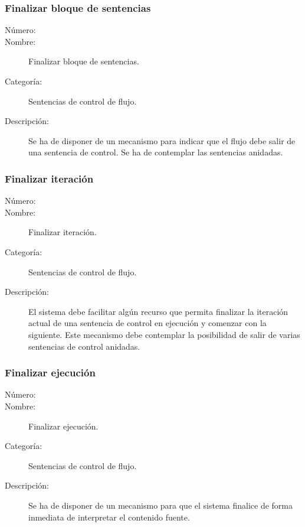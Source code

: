 \subsubsection{Finalizar bloque de sentencias}
	\begin{description}
		\item [Número:] \cn
		\item [Nombre:] Finalizar bloque de sentencias.
		\item [Categoría:] Sentencias de control de flujo.
		\item [Descripción:] Se ha de disponer de un mecanismo para indicar que el flujo debe salir de una sentencia de control. Se ha de contemplar
		las sentencias anidadas.
	\end {description}



\subsubsection{Finalizar iteración}
	\begin{description}
		\item [Número:] \cn
		\item [Nombre:] Finalizar iteración.
		\item [Categoría:] Sentencias de control de flujo.
		\item [Descripción:] El sistema debe facilitar algún recurso que permita finalizar la iteración actual
		de una sentencia de control en ejecución y comenzar con la siguiente. Este
		mecanismo debe contemplar la posibilidad de salir de varias sentencias de control anidadas.
	\end {description}

\subsubsection{Finalizar ejecución}
	\begin{description}
		\item [Número:] \cn
		\item [Nombre:] Finalizar ejecución.
		\item [Categoría:] Sentencias de control de flujo.
		\item [Descripción:] Se ha de disponer de un mecanismo para que el sistema finalice de forma inmediata de
		interpretar el contenido fuente.
	\end {description}

